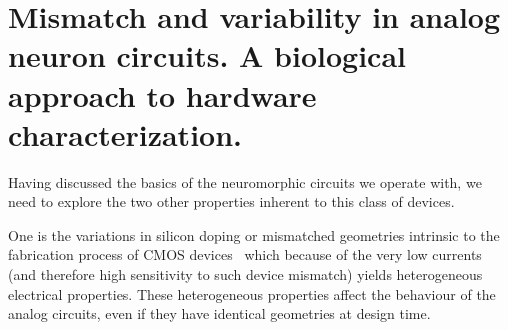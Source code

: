


\section{Mismatch and variability in analog neuron circuits. A biological approach to hardware characterization.}


Having discussed the basics of the neuromorphic circuits we operate with, we need to explore the two other properties inherent to this class of devices.

One is the variations in silicon doping or mismatched geometries intrinsic to the fabrication process of \ac{CMOS} devices~\cite{Pelgrom_etal89} which because of the very low currents (and therefore high sensitivity to such device mismatch) yields heterogeneous electrical properties. These heterogeneous properties affect the behaviour of the analog circuits, even if they have identical geometries at design time.

